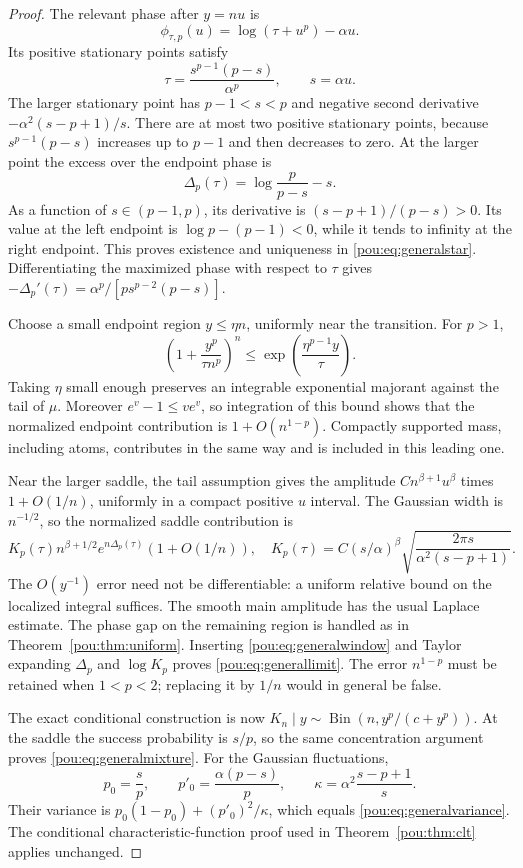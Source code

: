 \documentclass[11pt]{article}
\theoremstyle{definition}
\theoremstyle{remark}
\begin{document}
\begin{proof}
The relevant phase after $y=nu$ is
\[
 \phi_{\tau,p}(u)=\log(\tau+u^p)-\alpha u.
\]
Its positive stationary points satisfy
\[
 \tau=\frac{s^{p-1}(p-s)}{\alpha^p},\qquad s=\alpha u.
\]
The larger stationary point has $p-1<s<p$ and negative second derivative
$-\alpha^2(s-p+1)/s$.  There are at most two positive stationary points,
because $s^{p-1}(p-s)$ increases up to $p-1$ and then decreases to zero.
At the larger point the excess over the endpoint phase is
\begin{equation}\label{pou:eq:generalDelta}
 \Delta_p(\tau)=\log\frac p{p-s}-s.
\end{equation}
As a function of $s\in(p-1,p)$, its derivative is
$(s-p+1)/(p-s)>0$.  Its value at the left endpoint is
$\log p-(p-1)<0$, while it tends to infinity at the right endpoint.
This proves existence and uniqueness in \eqref{pou:eq:generalstar}.
Differentiating the maximized phase with respect to $\tau$ gives
$-\Delta_p'(\tau)=\alpha^p/[p s^{p-2}(p-s)]$.

Choose a small endpoint region $y\le\eta n$, uniformly near the transition.
For $p>1$,
\[
 \left(1+\frac{y^p}{\tau n^p}\right)^n
 \le\exp\left(\frac{\eta^{p-1}y}{\tau}\right).
\]
Taking $\eta$ small enough preserves an integrable exponential majorant
against the tail of $\mu$.  Moreover $e^v-1\le ve^v$, so integration of
this bound shows that the normalized endpoint contribution is
$1+O(n^{1-p})$.  Compactly supported mass, including atoms, contributes
in the same way and is included in this leading one.

Near the larger saddle, the tail assumption gives the amplitude
$C n^{\beta+1}u^\beta$ times $1+O(1/n)$, uniformly in a compact positive
$u$ interval.  The Gaussian width is $n^{-1/2}$, so the normalized saddle
contribution is
\[
 K_p(\tau)n^{\beta+1/2}e^{n\Delta_p(\tau)}(1+O(1/n)),
 \quad
 K_p(\tau)=C(s/\alpha)^\beta
 \sqrt{\frac{2\pi s}{\alpha^2(s-p+1)}}.
\]
The $O(y^{-1})$ error need not be differentiable: a uniform relative bound
on the localized integral suffices.  The smooth main amplitude has the
usual Laplace estimate.  The phase gap on the remaining region is handled
as in Theorem~\ref{pou:thm:uniform}.  Inserting \eqref{pou:eq:generalwindow} and
Taylor expanding $\Delta_p$ and $\log K_p$ proves
\eqref{pou:eq:generallimit}.  The error $n^{1-p}$ must be retained when
$1<p<2$; replacing it by $1/n$ would in general be false.

The exact conditional construction is now
$K_n\mid y\sim\operatorname{Bin}(n,y^p/(c+y^p))$.
At the saddle the success probability is $s/p$, so the same concentration
argument proves \eqref{pou:eq:generalmixture}.
For the Gaussian fluctuations,
\[
 p_0=\frac sp,\qquad
 p'_0=\frac{\alpha(p-s)}p,\qquad
 \kappa=\alpha^2\frac{s-p+1}{s}.
\]
Their variance is $p_0(1-p_0)+(p'_0)^2/\kappa$, which equals
\eqref{pou:eq:generalvariance}.  The conditional characteristic-function proof
used in Theorem~\ref{pou:thm:clt} applies unchanged.
\end{proof}
\end{document}
